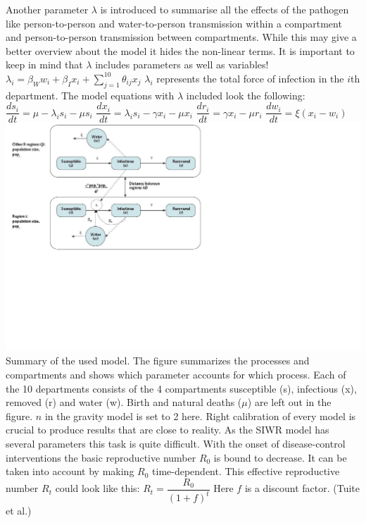 \documentclass[11pt]{article}
\begin{document}
Another parameter $ \lambda $ is introduced to summarise all the effects of the pathogen like person-to-person and water-to-person transmission within a compartment and person-to-person transmission between compartments. While this may give a better overview about the model it hides the non-linear terms. It is important to keep in mind that $ \lambda $ includes parameters as well as variables! 
\linebreak
$ \lambda_{i}=\beta_{W}w_{i}+\beta_{I}x_{i}+\sum_{j=1}^{10}\theta_{ij}x_{j}
$
\linebreak
$ \lambda_{i} $ represents the total force of infection in the $ i $th department. The model equations with $ \lambda $ included look the following:
\linebreak
$ \dfrac{ds_{i}}{dt}=\mu -\lambda_{i}s_{i}-\mu s_{i} $
\linebreak
$ \dfrac{dx_{i}}{dt}=\lambda_{i}s_{i}-\gamma x_{i}-\mu x_{i} $
\linebreak
$ \dfrac{dr_{i}}{dt}=\gamma x_{i}-\mu r_{i} $
\linebreak
$ \dfrac{dw_{i}}{dt}=\xi (x_{i}-w_{i}) $
\linebreak
\includegraphics[scale=1]{figure model haiti.jpg} 
Summary of the used model. The figure summarizes the processes and compartments and shows which parameter accounts for which process. Each of the 10 departments consists of the 4 compartments susceptible (s), infectious (x), removed (r) and water (w). Birth and natural deaths ($ \mu $) are left out in the figure. $ n $ in the gravity model is set to 2 here.
\linebreak
Right calibration of every model is crucial to produce results that are close to reality. As the SIWR model has several parameters this task is quite difficult. With the onset of disease-control interventions the basic reproductive number $ R_{0} $ is bound to decrease. It can be taken into account by making $ R_{0} $ time-dependent. This effective reproductive number $ R_{t} $ could look like this:
\linebreak
$ R_{t}=\dfrac{R_{0}}{(1+f)^{t}} $
\linebreak
Here $ f $ is a discount factor.
(Tuite et al.)
\end{document}
